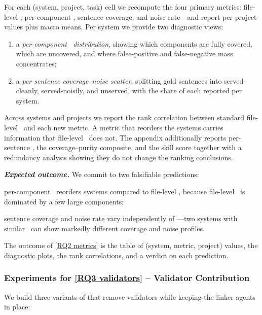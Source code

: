 For each (system, project, task) cell we recompute the four primary metrics: file-level \fone, per-component \fone, sentence coverage, and noise rate---and report per-project values plus macro means.
Per system we provide two diagnostic views:
\begin{enumerate}[leftmargin=*]
    \item a \emph{per-component \fone\ distribution}, showing which components are fully covered, which are uncovered, and where false-positive and false-negative mass concentrates;
    \item a \emph{per-sentence coverage--noise scatter}, splitting gold sentences into served-cleanly, served-noisily, and unserved, with the share of each reported per system.
\end{enumerate}
Across systems and projects we report the rank correlation between standard file-level \fone\ and each new metric.
A metric that reorders the systems carries information that file-level \fone\ does not.
The appendix additionally reports per-sentence \fone, the coverage--purity composite, and the skill score together with a redundancy analysis showing they do not change the ranking conclusions.

\emph{\textbf{Expected outcome.}}
We commit to two falsifiable predictions:
\begin{enumerate*}[label=(\roman*)]
    \item per-component \fone\ reorders systems compared to file-level \fone, because file-level \fone\ is dominated by a few large components;
    \item sentence coverage and noise rate vary independently of \fone---two systems with similar \fone\ can show markedly different coverage and noise profiles.
\end{enumerate*}
The outcome of \ref{RQ2 metrics} is the table of (system, metric, project) values, the diagnostic plots, the rank correlations, and a verdict on each prediction.

\subsubsection{Experiments for \ref{RQ3 validators} -- Validator Contribution}
\label{sec:exp:rq3}
We build three variants of \approach{} that remove validators while keeping the linker agents in place:

